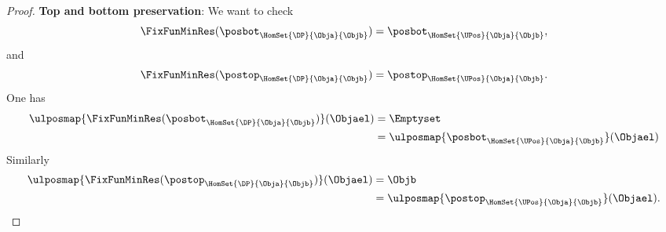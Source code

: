 \begin{proof}
    \textbf{Top and bottom preservation}:
    We want to check
    \begin{equation*}
        \FixFunMinRes(\posbot_{\HomSet{\DP}{\Obja}{\Objb}})=\posbot_{\HomSet{\UPos}{\Obja}{\Objb}},
    \end{equation*}
    and
    \begin{equation*}
        \FixFunMinRes(\postop_{\HomSet{\DP}{\Obja}{\Objb}})=\postop_{\HomSet{\UPos}{\Obja}{\Objb}}.
    \end{equation*}
    One has
    \begin{equation*}
        \begin{aligned}
            \ulposmap{\FixFunMinRes(\posbot_{\HomSet{\DP}{\Obja}{\Objb}})}(\Objael) & =\Emptyset \\
                                                                                    & =\ulposmap{\posbot_{\HomSet{\UPos}{\Obja}{\Objb}}}(\Objael)
        \end{aligned}
    \end{equation*}
    Similarly
    \begin{equation*}
        \begin{aligned}
            \ulposmap{\FixFunMinRes(\postop_{\HomSet{\DP}{\Obja}{\Objb}})}(\Objael) & =\Objb \\
                                                                                    & =\ulposmap{\postop_{\HomSet{\UPos}{\Obja}{\Objb}}}(\Objael).
        \end{aligned}
    \end{equation*}
\end{proof}

